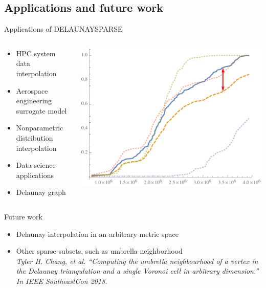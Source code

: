 \documentclass[xcolor=dvipsnames]{beamer}
\begin{document}
\subsection{Applications and future work}
\begin{frame}{Applications of DELAUNAYSPARSE}
\begin{columns}
\begin{column}{.48\textwidth}
\begin{itemize}
\item HPC system data interpolation
\item Aerospace engineering surrogate model
\item Nonparametric distribution interpolation
\item Data science applications
\item Delaunay graph
\end{itemize}
\end{column}
\begin{column}{.48\textwidth}
\includegraphics[width=\textwidth]{delaunay-dist-ex.pdf}
\end{column}
\end{columns}
\end{frame}
\begin{frame}{Future work}
\begin{itemize}
\item Delaunay interpolation in an arbitrary metric space
\item Other sparse subsets, such as umbrella neighborhood\\
{\it \small Tyler H. Chang, et al. 
``Computing the umbrella neighbourhood of a vertex in the Delaunay 
triangulation and a single Voronoi cell in arbitrary dimension.''
In IEEE SoutheastCon 2018.}
\end{itemize}
\end{frame}
\end{document}
